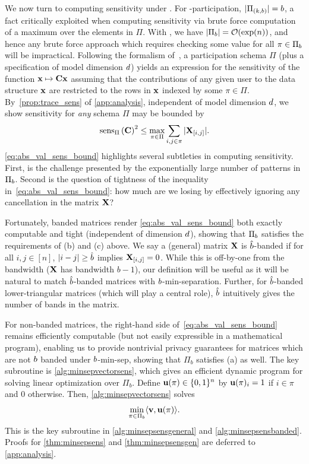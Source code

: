 \documentclass{article}
\begin{document}
%
We now turn to computing sensitivity under \bparticipation.  For \multiepoch-participation, $|\Pi_{(k,b)}| = b$, a fact \citet[Eq. 3]{choquette2022multi} critically exploited when computing sensitivity via brute force computation of a maximum over the elements in $\Pi$. With \bparticipation, we have $|\Pi_{b}| = \mathcal{O}(\exp(n))$, and hence any brute force approach which requires checking some value for all $\pi \in \Pi_{b}$ will be impractical.
%
Following the formalism of~\citep[Section 2]{choquette2022multi}, a participation schema $\Pi$ (plus a specification of model dimension $d$) yields an expression for the sensitivity of the function $\mathbf{x} \mapsto \mathbf{C}\mathbf{x}$ assuming that the contributions of any given user to the data structure $\mathbf{x}$ are restricted to the rows in $\mathbf{x}$ indexed by some $\pi \in \Pi$. By~\cref{prop:trace_sens} of \cref{app:analysis}, independent of model dimension $d$, we show sensitivity for \emph{any} schema $\Pi$ may be bounded by 
%
\begin{equation}\label{eq:abs_val_sens_bound}
    \operatorname{sens}_\Pi\left(\mathbf{C}\right)^2  \leq \max_{\pi \in \Pi} \sum_{i,j \in \pi} | \mathbf{X}_{[i,j]}|.
\end{equation}
%
\cref{eq:abs_val_sens_bound} highlights several subtleties in computing sensitivity. First, is the challenge presented by the exponentially large number of patterns in $\Pi_{b}$. Second is the question of tightness of the inequality in~\cref{eq:abs_val_sens_bound}: how much are we losing by effectively ignoring any cancellation in the matrix $\mathbf{X}$?

 Fortunately, banded matrices render \cref{eq:abs_val_sens_bound} both exactly computable and tight (independent of dimension $d$), showing that $\Pi_{b}$ satisfies the requirements of (b) and (c) above. We say a (general) matrix $\mathbf{X}$ is $\hat{b}$-banded if for all $i,j \in [n]$, $|i -j| \ge \hat{b}$ implies $\mathbf{X}_{[i, j]} = 0$. While this is off-by-one from the bandwidth ($\mathbf{X}$ has bandwidth $b-1$), our definition will be useful as it will be natural to match $\hat{b}$-banded matrices with $b$-min-separation. Further, for $\hat{b}$-banded lower-triangular matrices (which will play a central role), $\hat{b}$ intuitively gives the number of bands in the matrix.

For non-banded matrices, the right-hand side of~\cref{eq:abs_val_sens_bound} remains efficiently computable (but not easily expressible in a mathematical program), enabling us to provide nontrivial privacy guarantees for matrices which are not $b$ banded under $b$-min-sep, showing that $\Pi_b$ satisfies (a) as well. The key subroutine is \cref{alg:minsepvectorsens}, which gives an efficient dynamic program for solving linear optimization over $\Pi_b$.  Define $\mathbf{u}(\pi) \in \{0, 1\}^{n}$ by $\mathbf{u}(\pi)_i = 1$ if $i \in \pi$ and 0 otherwise. Then, \cref{alg:minsepvectorsens} solves
\[
   \min_{\pi \in \Pi_{b}} \langle \mathbf{v}, \mathbf{u}(\pi) \rangle.
\]
This is the key subroutine in \cref{alg:minsepsensgeneral} and \cref{alg:minsepsensbanded}. Proofs for \cref{thm:minsepsens} and \cref{thm:minsepsensgen} are deferred to \cref{app:analysis}.
%
\end{document}
